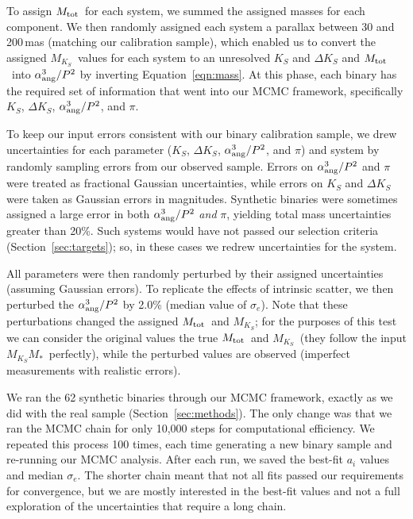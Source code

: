\documentclass[twocolumn]{aastex62}
\newcommand{\mks}{$M_{K_S}$}
\newcommand{\mmk}{$M_{K_S}$\textendash$M_*$}
\newcommand{\mtot}{$M_{\rm{tot}}$}
\begin{document}
To assign \mtot\ for each system, we summed the assigned masses for each component. We then randomly assigned each system a parallax between 30 and 200\,mas (matching our calibration sample), which enabled us to convert the assigned \mks\ values for each system to an unresolved $K_S$ and $\Delta K_S$ and \mtot\  into $\alpha_{\rm{ang}}^3/P^2$ by inverting Equation~\ref{eqn:mass}. At this phase, each binary has the required set of information that went into our MCMC framework, specifically $K_S$, $\Delta K_S$, $\alpha_{\rm{ang}}^3/P^2$, and $\pi$. 

To keep our input errors consistent with our binary calibration sample, we drew uncertainties for each parameter ($K_S$, $\Delta K_S$, $\alpha_{\rm{ang}}^3/P^2$, and $\pi$) and system by randomly sampling errors from our observed sample. Errors on $\alpha_{\rm{ang}}^3/P^2$ and $\pi$ were treated as fractional Gaussian uncertainties, while errors on $K_S$ and $\Delta K_S$ were taken as Gaussian errors in magnitudes. Synthetic binaries were sometimes assigned a large error in both $\alpha_{\rm{ang}}^3/P^2$ {\it and} $\pi$, yielding total mass uncertainties greater than 20\%. Such systems would have not passed our selection criteria (Section~\ref{sec:targets}); so, in these cases we redrew uncertainties for the system. 

All parameters were then randomly perturbed by their assigned uncertainties (assuming Gaussian errors). To replicate the effects of intrinsic scatter, we then perturbed the $\alpha_{\rm{ang}}^3/P^2$ by 2.0\% (median value of $\sigma_e$). Note that these perturbations changed the assigned \mtot\ and \mks; for the purposes of this test we can consider the original values the true \mtot\ and \mks\ (they follow the input \mmk\ perfectly), while the perturbed values are observed (imperfect measurements with realistic errors). 

We ran the 62 synthetic binaries through our MCMC framework, exactly as we did with the real sample (Section~\ref{sec:methods}). The only change was that we ran the MCMC chain for only 10,000 steps for computational efficiency. We repeated this process 100 times, each time generating a new binary sample and re-running our MCMC analysis. After each run, we saved the best-fit $a_i$ values and median $\sigma_e$. The shorter chain meant that not all fits passed our requirements for convergence, but we are mostly interested in the best-fit values and not a full exploration of the uncertainties that require a long chain. 
\end{document}
